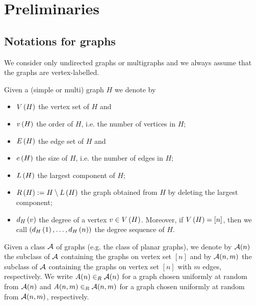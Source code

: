 \section{Preliminaries}\label{MDsec:prelim}
\subsection{Notations for graphs}
We consider only undirected graphs or multigraphs and we always assume that the graphs are vertex-labelled.
\begin{definition}
	Given a (simple or multi) graph $H$ we denote by
	\begin{itemize}
		\item 
		$\vertexSet{H}$ the vertex set of $H$ and
		\item[]
		$\numberVertices{H}$ the order of $H$, i.e. the number of vertices in $H$;
		\item 
		$\edgeSet{H}$ the edge set of $H$ and
		\item[]
		$\numberEdges{H}$ the size of $H$, i.e. the number of edges in $H$;	
		\item 
		$\largestcomponent{H}$ the largest component of $H$;
		\item
		$\rest{H}:=H \setminus \largestcomponent{H}$ the graph obtained from $H$ by deleting the largest component;
		\item
		$\degree{v}{H}$ the degree of a vertex $v\in\vertexSet{H}$. Moreover, if $\vertexSet{H}=[n]$, then we call $\left(\degree{1}{H}, \ldots, \degree{n}{H}\right)$ the degree sequence of $H$.
	\end{itemize}
\end{definition}
\begin{definition}\label{MDdef:graph_class}
	Given a class $\cl$ of graphs (e.g. the class of planar graphs), we denote by 
	$\cl(n)$ the subclass of $\cl$ containing the graphs on vertex set $[n]$ 
	and by $\cl(n,m)$ the subclass of $\cl$ containing the graphs on vertex set $[n]$ with $m$ edges, respectively. We write $\randomGraph(n)\ur \cl(n)$ for a graph chosen uniformly at random from $\cl(n)$
	and $\randomGraph(n,m)\ur \cl(n,m)$ for a graph chosen uniformly at random from $\cl(n,m)$, respectively.
\end{definition}

